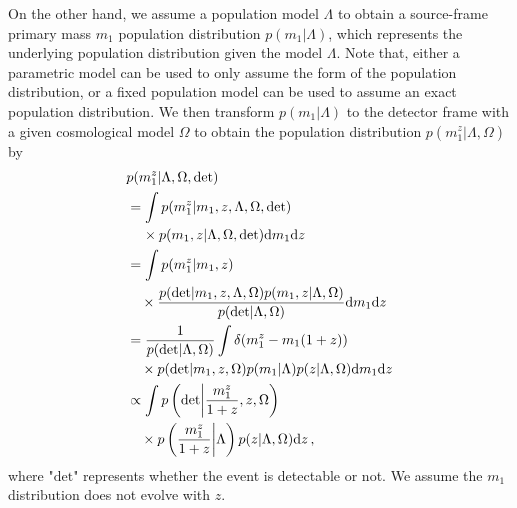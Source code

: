 \documentclass[sn-aps, pdflatex, iicol]{sn-jnl}
\begin{document}
On the other hand, we assume a population model $\Lambda$ to obtain a source-frame primary mass $m_1$ population distribution $p(m_1|\Lambda)$, which represents the underlying population distribution given the model $\Lambda$.
Note that, either a parametric model can be used to only assume the form of the population distribution, or a fixed population model can be used to assume an exact population distribution.
We then transform $p(m_1|\Lambda)$ to the detector frame with a given cosmological model $\Omega$ to obtain the population distribution $p(m^z_1|\Lambda, \Omega)$ by
\begin{equation}
    \mathtoolsset{multlined-width=0.89\displaywidth}
    \begin{aligned}
        &p(m^z_1|\Lambda, \Omega, \mathrm{det}) \\
        &\begin{multlined}
            = \int p(m^z_1|m_1, z, \Lambda, \Omega, \mathrm{det}) \\ \times p(m_1, z|\Lambda, \Omega, \mathrm{det}) \mathrm{d}m_1 \mathrm{d}z
        \end{multlined} \\
        &\begin{multlined}
            = \int p(m^z_1|m_1, z) \\ \times \frac{p(\mathrm{det}|m_1, z, \Lambda, \Omega)p(m_1, z|\Lambda, \Omega)}{p(\mathrm{det}|\Lambda, \Omega)} \mathrm{d}m_1 \mathrm{d}z
        \end{multlined} \\
        &\begin{multlined}
            = \frac{1}{p(\mathrm{det}|\Lambda, \Omega)}\int \delta(m^z_1-m_1(1+z)) \\ \times p(\mathrm{det}|m_1, z, \Omega)p(m_1|\Lambda)p(z|\Lambda, \Omega) \mathrm{d}m_1 \mathrm{d}z
        \end{multlined}\\
        &\begin{multlined}
            \propto \int p\left(\mathrm{det}\middle|\frac{m^z_1}{1+z},z,\Omega\right) \\ \times p\left(\frac{m^z_1}{1+z}\middle|\Lambda\right)p(z|\Lambda, \Omega) \mathrm{d}z\,,
        \end{multlined}
    \end{aligned}
    \label{eq:transformation}
\end{equation}
where "$\mathrm{det}$" represents whether the event is detectable or not.
We assume the $m_1$ distribution does not evolve with $z$.
\end{document}

